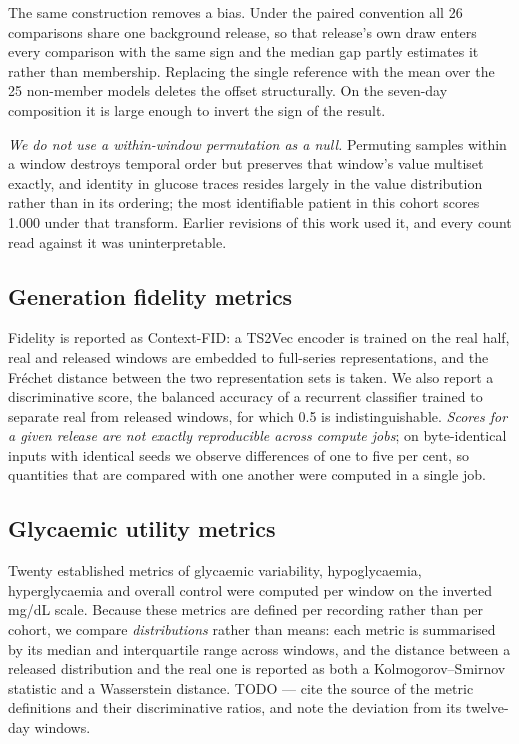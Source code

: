 \documentclass[pdflatex,sn-nature]{sn-jnl}
\theoremstyle{thmstyleone}
\begin{document}
The same construction removes a bias. Under the paired convention all 26
comparisons share one background release, so that release's own draw enters
every comparison with the same sign and the median gap partly estimates it
rather than membership. Replacing the single reference with the mean over the
25 non-member models deletes the offset structurally. On the seven-day
composition it is large enough to invert the sign of the result.

\emph{We do not use a within-window permutation as a null.} Permuting samples
within a window destroys temporal order but preserves that window's value
multiset exactly, and identity in glucose traces resides largely in the value
distribution rather than in its ordering; the most identifiable patient in this
cohort scores 1.000 under that transform. Earlier revisions of this work used
it, and every count read against it was uninterpretable.

\subsection{Generation fidelity metrics}\label{subsec:fidelity}
Fidelity is reported as Context-FID: a TS2Vec encoder is trained on the real
half, real and released windows are embedded to full-series representations, and
the Fréchet distance between the two representation sets is taken. We also
report a discriminative score, the balanced accuracy of a recurrent classifier
trained to separate real from released windows, for which 0.5 is indistinguishable.
\emph{Scores for a given release are not exactly reproducible across compute
jobs}; on byte-identical inputs with identical seeds we observe differences of
one to five per cent, so quantities that are compared with one another were
computed in a single job.

\subsection{Glycaemic utility metrics}\label{subsec:utility}
Twenty established metrics of glycaemic variability, hypoglycaemia,
hyperglycaemia and overall control were computed per window on the inverted
mg/dL scale. Because these metrics are defined per recording rather than per
cohort, we compare \emph{distributions} rather than means: each metric is
summarised by its median and interquartile range across windows, and the
distance between a released distribution and the real one is reported as both a
Kolmogorov--Smirnov statistic and a Wasserstein distance. TODO --- cite the
source of the metric definitions and their discriminative ratios, and note the
deviation from its twelve-day windows.
\end{document}
